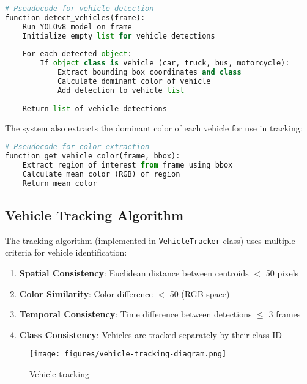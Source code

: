 \documentclass[9pt,a4paper,twoside]{rho-class/rho}
\begin{document}
    \begin{lstlisting}[caption=Pseudocode for vehicle detection, language=Python]
# Pseudocode for vehicle detection
function detect_vehicles(frame):
    Run YOLOv8 model on frame
    Initialize empty list for vehicle detections
    
    For each detected object:
        If object class is vehicle (car, truck, bus, motorcycle):
            Extract bounding box coordinates and class
            Calculate dominant color of vehicle
            Add detection to vehicle list
    
    Return list of vehicle detections
    \end{lstlisting}
    
    The system also extracts the dominant color of each vehicle for use in tracking:
    
    \begin{lstlisting}[caption=Pseudocode for color extraction, language=Python]
# Pseudocode for color extraction
function get_vehicle_color(frame, bbox):
    Extract region of interest from frame using bbox
    Calculate mean color (RGB) of region
    Return mean color
    \end{lstlisting}
    
    \subsection{Vehicle Tracking Algorithm}
    
    The tracking algorithm (implemented in \texttt{VehicleTracker} class) uses multiple criteria for vehicle identification:
    
    \begin{enumerate}
        \item \textbf{Spatial Consistency}: Euclidean distance between centroids $<$ 50 pixels
        \item \textbf{Color Similarity}: Color difference $<$ 50 (RGB space)
        \item \textbf{Temporal Consistency}: Time difference between detections $\leq$ 3 frames
        \item \textbf{Class Consistency}: Vehicles are tracked separately by their class ID
    \end{enumerate}
    
    \begin{figure}[h]
        \centering
        \texttt{[image: figures/vehicle-tracking-diagram.png]}
        \caption{Vehicle tracking }
        \label{fig:vehicle-tracking}
    \end{figure}
\end{document}
